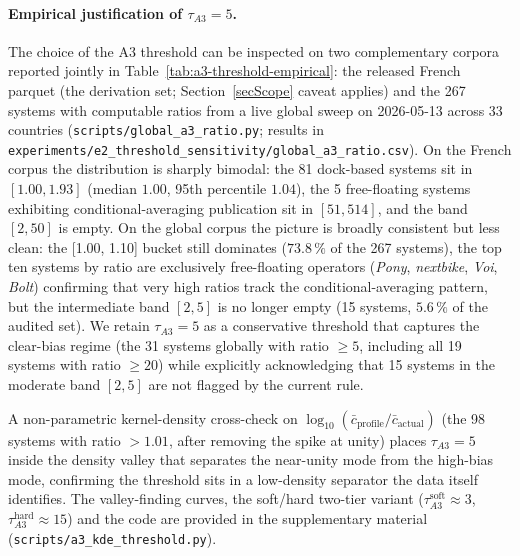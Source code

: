 \documentclass[11pt,a4paper]{article}
\begin{document}
\paragraph{Empirical justification of $\tau_{A3} = 5$.}
The choice of the A3 threshold can be inspected on two
complementary corpora reported jointly in
Table~\ref{tab:a3-threshold-empirical}: the released French
parquet (the derivation set; Section~\ref{secScope} caveat
applies) and the 267 systems with computable ratios from a
live global sweep on 2026-05-13 across 33 countries
(\texttt{scripts/global\_a3\_ratio.py}; results in
\texttt{experiments/e2\_threshold\_sensitivity/global\_a3\_ratio.csv}).
On the French corpus the distribution is sharply bimodal: the
81 dock-based systems sit in $[1.00, 1.93]$
(median $1.00$, 95th percentile $1.04$), the 5 free-floating
systems exhibiting conditional-averaging publication sit in
$[51, 514]$, and the band $[2, 50]$ is empty. On the global
corpus the picture is broadly consistent but less clean: the
[1.00, 1.10] bucket still dominates ($73.8\,\%$ of the 267
systems), the top ten systems by ratio are exclusively
free-floating operators (\emph{Pony}, \emph{nextbike},
\emph{Voi}, \emph{Bolt}) confirming that very high ratios track
the conditional-averaging pattern, but the intermediate band
$[2, 5]$ is no longer empty (15 systems, $5.6\,\%$ of the
audited set). We retain $\tau_{A3} = 5$ as a conservative
threshold that captures the clear-bias regime (the 31 systems
globally with ratio $\geq 5$, including all 19 systems with
ratio $\geq 20$) while explicitly acknowledging that 15 systems
in the moderate band $[2, 5]$ are not flagged by the current
rule.

A non-parametric kernel-density cross-check on
$\log_{10}(\bar c_{\text{profile}}/\bar c_{\text{actual}})$ (the 98
systems with ratio $> 1.01$, after removing the spike at unity)
places $\tau_{A3} = 5$ inside the density valley that separates the
near-unity mode from the high-bias mode, confirming the threshold
sits in a low-density separator the data itself identifies. The
valley-finding curves, the soft/hard two-tier variant
($\tau_{A3}^{\text{soft}} \approx 3$, $\tau_{A3}^{\text{hard}}
\approx 15$) and the code are provided in the supplementary material
(\texttt{scripts/a3\_kde\_threshold.py}).

\end{document}
